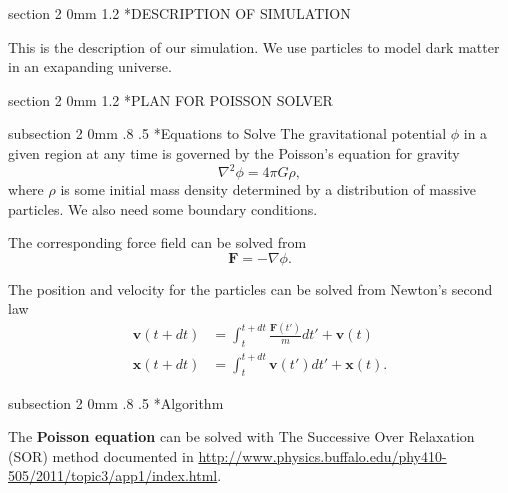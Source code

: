 \documentclass[titlepage, 11pt]{article}
\makeatletter
\renewcommand{\section}{\@startsection
        {section}
        {2}
        {0mm}
        {1.2\baselineskip}
        {\baselineskip}
        {\centering\normalsize}}
\renewcommand{\subsection}{\@startsection
        {subsection}
        {2}
        {0mm}
        {.8\baselineskip}
        {.5\baselineskip}
        {\bfseries\normalsize}}
\makeatother
\begin{document}


%

\section*{DESCRIPTION OF SIMULATION}

This is the description of our simulation. We use particles to model dark
matter in an exapanding universe.

\section*{PLAN FOR POISSON SOLVER}

\subsection*{Equations to Solve}
The gravitational potential $\phi$ in a given region 
at any time is governed by the Poisson's equation for gravity
\begin{equation}
\nabla^2 \phi = 4\pi G\rho, 
\end{equation}
where $\rho$ is some initial mass density determined by a 
distribution of massive particles. We also need some boundary conditions.

The corresponding force field can be solved from 
\begin{equation}
\mathbf{F} = -\nabla \phi.
\end{equation}

The position and velocity for the particles can be solved from 
Newton's second law
\begin{align}
\mathbf{v}(t+dt) &= \int_{t}^{t+dt}\frac{\mathbf{F}(t')}{m}dt' + \mathbf{v}(t)\\
\mathbf{x}(t+dt) &= \int_{t}^{t+dt}\mathbf{v}(t')dt' + \mathbf{x}(t).
\end{align}



\subsection*{Algorithm}

The \textbf{Poisson equation} can be solved with The Successive Over Relaxation (SOR) 
method documented in \url{http://www.physics.buffalo.edu/phy410-505/2011/topic3/app1/index.html}. 
\end{document}
